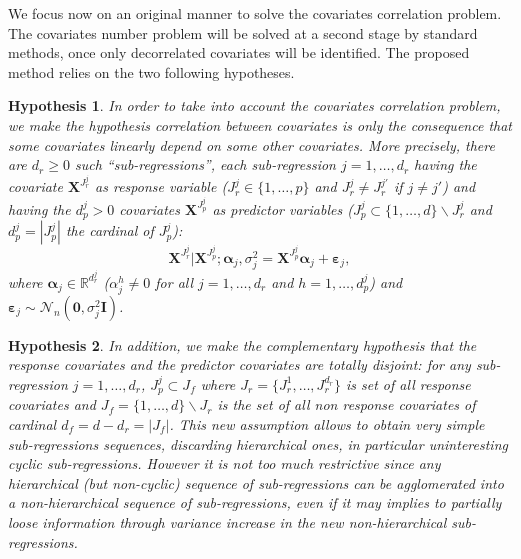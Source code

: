 \documentclass[11pt,a4paper]{article}
\newtheorem{hyp}{Hypothesis}
\begin{document}
We focus now on an original manner to solve the covariates correlation problem. The covariates number problem will be solved at a second stage by standard methods, once only decorrelated covariates will be identified. The proposed method relies on the two following hypotheses.

\begin{hyp}\label{H1}
In order to take into account the covariates correlation problem, we make the hypothesis correlation between covariates is {\it only} the consequence that some covariates {\it linearly} depend on some other covariates. More precisely, there are $d_{r}\geq 0$ such ``sub-regressions'', each sub-regression $j=1,\ldots,d_{r}$ having the covariate $\boldsymbol{X}^{J_{r}^j}$ as {\it response} variable ($J_{r}^j\in\{1,\ldots,p\}$ and $J_{r}^j\neq J_{r}^{j'}$ if $j\neq j'$) and having the $d_p^j>0$ covariates $\boldsymbol{X}^{J_{p}^j}$  as {\it predictor} variables ($J_{p}^j\subset\{1,\ldots,d\} \backslash J_{r}^j$ and $d_p^j=|J_{p}^j|$ the cardinal of $J_{p}^j$):
\begin{equation}
\boldsymbol{X}^{J_{r}^j}|\boldsymbol{X}^{J_{p}^j};\boldsymbol{\alpha}_j,\sigma^2_j=\boldsymbol{X}^{J_{p}^j}\boldsymbol{\alpha}_j+\boldsymbol{\varepsilon}_j, \label{eq:SR}
\end{equation}
where $\boldsymbol{\alpha}_j\in{\mathbb{R}^{d_r^j}}$ (${\alpha}_j^h\neq 0$ for all $j=1,\ldots,d_r$ and $h=1,\ldots,d_p^j$) and $\boldsymbol{\varepsilon}_j \sim\mathcal{N}_n(\boldsymbol{0},\sigma^2_j\boldsymbol{I})$.
\end{hyp}

\begin{hyp}\label{H2}
In addition, we make the complementary hypothesis that the response covariates and the predictor covariates are totally disjoint: for any sub-regression $j=1,\ldots,d_{r}$, $J_{p}^j\subset J_f$ where $J_{r}=\{J_{r}^1,\ldots,J_{r}^{d_r}\}$ is set of all response covariates and $J_f=\{1,\ldots,d\} \backslash J_{r}$ is the set of all {\it non} response covariates of cardinal $d_f=d-d_r=|J_f|$. This new assumption allows to obtain very simple sub-regressions sequences, discarding hierarchical ones, in particular uninteresting cyclic sub-regressions. However it is not too much restrictive since any hierarchical (but non-cyclic) sequence of sub-regressions can be agglomerated into a non-hierarchical sequence of sub-regressions, even if it may implies to partially loose information through variance increase in the new non-hierarchical sub-regressions.
\end{hyp}
\end{document}
